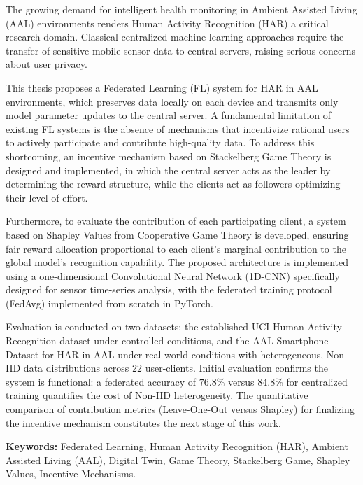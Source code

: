 
\noindent
The growing demand for intelligent health monitoring in Ambient Assisted Living
(AAL) environments renders Human Activity Recognition (HAR) a critical research
domain. Classical centralized machine learning approaches require the transfer
of sensitive mobile sensor data to central servers, raising serious concerns
about user privacy.

This thesis proposes a Federated Learning (FL) system for HAR in AAL
environments, which preserves data locally on each device and transmits only
model parameter updates to the central server. A fundamental limitation of
existing FL systems is the absence of mechanisms that incentivize rational users
to actively participate and contribute high-quality data. To address this
shortcoming, an incentive mechanism based on Stackelberg Game Theory is designed
and implemented, in which the central server acts as the leader by determining
the reward structure, while the clients act as followers optimizing their level
of effort.

Furthermore, to evaluate the contribution of each participating client, a system
based on Shapley Values from Cooperative Game Theory is developed, ensuring fair
reward allocation proportional to each client's marginal contribution to the
global model's recognition capability. The proposed architecture is implemented
using a one-dimensional Convolutional Neural Network (1D-CNN) specifically
designed for sensor time-series analysis, with the federated training protocol
(FedAvg) implemented from scratch in PyTorch.

Evaluation is conducted on two datasets: the established UCI Human Activity
Recognition dataset under controlled conditions, and the AAL Smartphone
Dataset for HAR in AAL under real-world conditions with heterogeneous,
Non-IID data distributions across 22 user-clients. Initial evaluation confirms
the system is functional: a federated accuracy of $76.8\%$ versus $84.8\%$ for
centralized training quantifies the cost of Non-IID heterogeneity. The
quantitative comparison of contribution metrics (Leave-One-Out versus Shapley)
for finalizing the incentive mechanism constitutes the next stage of this work.

\vspace{1.5em}
\noindent
\textbf{Keywords:}
Federated Learning,
Human Activity Recognition (HAR),
Ambient Assisted Living (AAL),
Digital Twin,
Game Theory,
Stackelberg Game,
Shapley Values,
Incentive Mechanisms.
